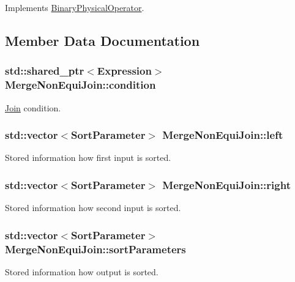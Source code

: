 Implements \hyperlink{class_binary_physical_operator_a29ec622920006cb5428bf2c259918347}{Binary\+Physical\+Operator}.



\subsection{Member Data Documentation}
\hypertarget{class_merge_non_equi_join_ad1307cbe8f5e88f685ece833fcea67c2}{
\subsubsection[{condition}]{\setlength{\rightskip}{0pt plus 5cm}std\+::shared\+\_\+ptr$<${\bf Expression}$>$ Merge\+Non\+Equi\+Join\+::condition}}\label{class_merge_non_equi_join_ad1307cbe8f5e88f685ece833fcea67c2}
\hyperlink{class_join}{Join} condition. \hypertarget{class_merge_non_equi_join_a785b0aeaa5ec15536c03272a21f8ebe0}{
\subsubsection[{left}]{\setlength{\rightskip}{0pt plus 5cm}std\+::vector$<${\bf Sort\+Parameter}$>$ Merge\+Non\+Equi\+Join\+::left}}\label{class_merge_non_equi_join_a785b0aeaa5ec15536c03272a21f8ebe0}
Stored information how first input is sorted. \hypertarget{class_merge_non_equi_join_ae3631adf9752e5ab861dbf986b92ff00}{
\subsubsection[{right}]{\setlength{\rightskip}{0pt plus 5cm}std\+::vector$<${\bf Sort\+Parameter}$>$ Merge\+Non\+Equi\+Join\+::right}}\label{class_merge_non_equi_join_ae3631adf9752e5ab861dbf986b92ff00}
Stored information how second input is sorted. \hypertarget{class_merge_non_equi_join_a5f8b68c20d65ec2e07f41f2c2c4079d6}{
\subsubsection[{sort\+Parameters}]{\setlength{\rightskip}{0pt plus 5cm}std\+::vector$<${\bf Sort\+Parameter}$>$ Merge\+Non\+Equi\+Join\+::sort\+Parameters}}\label{class_merge_non_equi_join_a5f8b68c20d65ec2e07f41f2c2c4079d6}
Stored information how output is sorted. 

